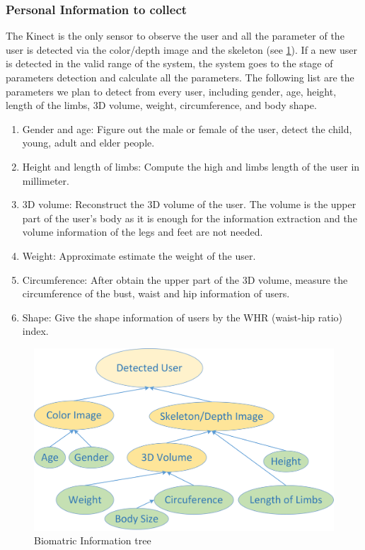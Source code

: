 \subsubsection{Personal Information to collect}
The Kinect is the only sensor to observe the user and all the parameter of the user is detected via the color/depth image and the skeleton (see \figurename{\ref{fig:3-PRMM:BiomatricInformation}}). If a new user is detected in the valid range of the system, the system goes to the stage of parameters detection and calculate all the parameters. The following list are the parameters we plan to detect from every user, including gender, age, height, length of the limbs, 3D volume, weight, circumference, and body shape.
\begin{enumerate} [label=\arabic*.]
	\item  Gender and age: Figure out the male or female of the user, detect the child, young, adult and elder people.
	\item  Height and length of limbs: Compute the high and limbs length of the user in millimeter.
	\item 3D volume: Reconstruct the 3D volume of the user. The volume is the upper part of the user's body as it is enough for the information extraction and the volume information of the legs and feet are not needed.
	\item  Weight: Approximate estimate the weight of the user.
	\item  Circumference: After obtain the upper part of the 3D volume, measure the circumference of the bust, waist and hip information of users.
	\item  Shape: Give the shape information of users by the WHR (waist-hip ratio) index.
\end{enumerate}
\begin{figure}
\centering
\includegraphics[width=0.7\linewidth]{figures/3-PRMM/BiomatricInformation}
\caption[Biomatric Information]{Biomatric Information tree}
\label{fig:3-PRMM:BiomatricInformation}
\end{figure}

